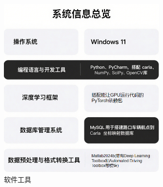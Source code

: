 \begin{figure}[htbp] %
	\centering
	\includegraphics[width=0.75\textwidth]{p31} %
	\caption{软件工具} %
	\label{fig:p31} %
\end{figure}










